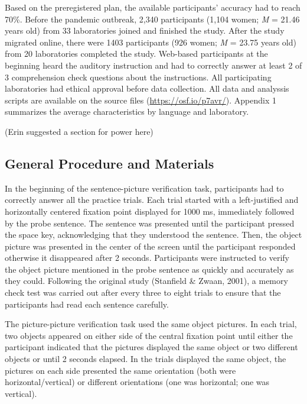 \documentclass[
  man,floatsintext]{apa6}
\begin{document}
Based on the preregistered plan, the available participants' accuracy had to reach 70\%. Before the pandemic outbreak, 2,340 participants (1,104 women; \emph{M} = 21.46 years old) from 33 laboratories joined and finished the study. After the study migrated online, there were 1403 participants (926 women; \emph{M} = 23.75 years old) from 20 laboratories completed the study. Web-based participants at the beginning heard the auditory instruction and had to correctly answer at least 2 of 3 comprehension check questions about the instructions. All participating laboratories had ethical approval before data collection. All data and analyssis scripts are available on the source files (\url{https://osf.io/p7avr/}). Appendix 1 summarizes the average characteristics by language and laboratory.

(Erin suggested a section for power here)

\hypertarget{general-procedure-and-materials}{%
\subsection{General Procedure and Materials}\label{general-procedure-and-materials}}

In the beginning of the sentence-picture verification task, participants had to correctly answer all the practice trials. Each trial started with a left-justified and horizontally centered fixation point displayed for 1000 ms, immediately followed by the probe sentence. The sentence was presented until the participant pressed the space key, acknowledging that they understood the sentence. Then, the object picture was presented in the center of the screen until the participant responded otherwise it disappeared after 2 seconds. Participants were instructed to verify the object picture mentioned in the probe sentence as quickly and accurately as they could. Following the original study (Stanfield \& Zwaan, 2001), a memory check test was carried out after every three to eight trials to ensure that the participants had read each sentence carefully.

The picture-picture verification task used the same object pictures. In each trial, two objects appeared on either side of the central fixation point until either the participant indicated that the pictures displayed the same object or two different objects or until 2 seconds elapsed. In the trials displayed the same object, the pictures on each side presented the same orientation (both were horizontal/vertical) or different orientations (one was horizontal; one was vertical).
\end{document}
